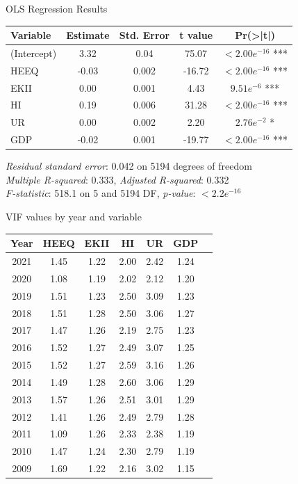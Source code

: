 \documentclass[10pt]{beamer}
\begin{document}
\begin{frame}{OLS Regression Results}
\begin{table}[ht]
\centering
\begin{tabular}{@{}lcccc@{}}
\toprule
Variable & Estimate & Std. Error & t value & Pr(>|t|) \\ 
\midrule
(Intercept) & 3.32 & 0.04 & 75.07 & $<2.00e^{-16}$ *** \\
HEEQ        & -0.03 & 0.002 & -16.72 & $<2.00e^{-16}$ *** \\
EKII        & 0.00 & 0.001 & 4.43 & $9.51e^{-6}$ *** \\
HI          & 0.19 & 0.006 & 31.28 & $<2.00e^{-16}$ *** \\
UR          & 0.00 & 0.002 & 2.20 & $2.76e^{-2}$ * \\
GDP         & -0.02 & 0.001 & -19.77 & $<2.00e^{-16}$ *** \\
\bottomrule
\end{tabular}
\bigskip %

\textit{Residual standard error}: 0.042 on 5194 degrees of freedom \\
\textit{Multiple R-squared}: 0.333, \textit{Adjusted R-squared}: 0.332 \\
\textit{F-statistic}: 518.1 on 5 and 5194 DF, \textit{p-value}: $<2.2e^{-16}$
\end{table}
\end{frame}


\begin{frame}{VIF values by year and variable}
\begin{table}[ht]
\centering
\begin{tabular}{ccccccc}
\toprule
Year & HEEQ & EKII & HI & UR & GDP \\
\midrule
2021 & 1.45 & 1.22 & 2.00 & 2.42 & 1.24 \\
2020 & 1.08 & 1.19 & 2.02 & 2.12 & 1.20 \\
2019 & 1.51 & 1.23 & 2.50 & 3.09 & 1.23 \\
2018 & 1.51 & 1.28 & 2.50 & 3.06 & 1.27 \\
2017 & 1.47 & 1.26 & 2.19 & 2.75 & 1.23 \\
2016 & 1.52 & 1.27 & 2.49 & 3.07 & 1.25 \\
2015 & 1.52 & 1.27 & 2.59 & 3.16 & 1.26 \\
2014 & 1.49 & 1.28 & 2.60 & 3.06 & 1.29 \\
2013 & 1.57 & 1.26 & 2.51 & 3.01 & 1.29 \\
2012 & 1.41 & 1.26 & 2.49 & 2.79 & 1.28 \\
2011 & 1.09 & 1.26 & 2.33 & 2.38 & 1.19 \\
2010 & 1.47 & 1.24 & 2.30 & 2.79 & 1.19 \\
2009 & 1.69 & 1.22 & 2.16 & 3.02 & 1.15 \\
\bottomrule
\end{tabular}
\end{table}
\end{frame}
\end{document}
